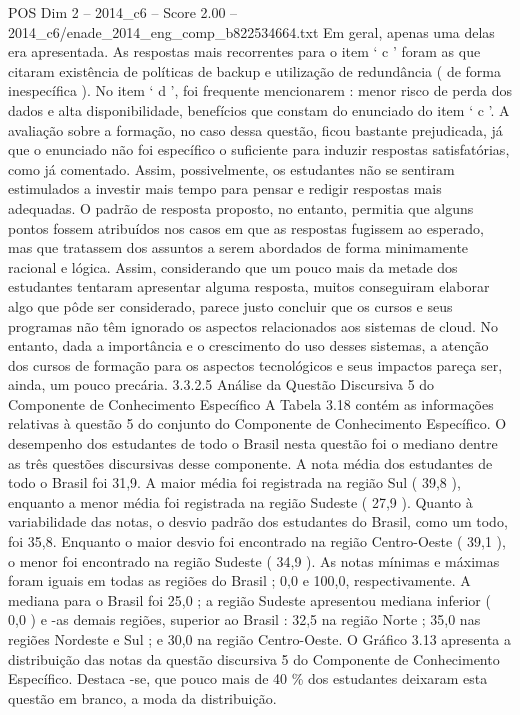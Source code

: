 \begin{textsample}{POS Dim 2 – 2014\_c6 – Score 2.00 – 2014\_c6/enade\_2014\_eng\_comp\_b822534664.txt}
Em geral, apenas uma delas era apresentada.
As respostas mais recorrentes para o item ‘ c ’ foram as que citaram existência de políticas de backup e utilização de redundância ( de forma inespecífica ).
No item ‘ d ’, foi frequente mencionarem : menor risco de perda dos dados e alta disponibilidade, benefícios que constam do enunciado do item ‘ c ’.
A avaliação sobre a formação, no caso dessa questão, ficou bastante prejudicada, já que o enunciado não foi específico o suficiente para induzir respostas satisfatórias, como já comentado.
Assim, possivelmente, os estudantes não se sentiram estimulados a investir mais tempo para pensar e redigir respostas mais adequadas.
O padrão de resposta proposto, no entanto, permitia que alguns pontos fossem atribuídos nos casos em que as respostas fugissem ao esperado, mas que tratassem dos assuntos a serem abordados de forma minimamente racional e lógica.
Assim, considerando que um pouco mais da metade dos estudantes tentaram apresentar alguma resposta, muitos conseguiram elaborar algo que pôde ser considerado, parece justo concluir que os cursos e seus programas não têm ignorado os aspectos relacionados aos sistemas de cloud.
No entanto, dada a importância e o crescimento do uso desses sistemas, a atenção dos cursos de formação para os aspectos tecnológicos e seus impactos pareça ser, ainda, um pouco precária. 3.3.2.5 Análise da Questão Discursiva 5 do Componente de Conhecimento Específico A Tabela 3.18 contém as informações relativas à questão 5 do conjunto do Componente de Conhecimento Específico.
O desempenho dos estudantes de todo o Brasil nesta questão foi o mediano dentre as três questões discursivas desse componente.
A nota média dos estudantes de todo o Brasil foi 31,9.
A maior média foi registrada na região Sul ( 39,8 ), enquanto a menor média foi registrada na região Sudeste ( 27,9 ).
Quanto à variabilidade das notas, o desvio padrão dos estudantes do Brasil, como um todo, foi 35,8.
Enquanto o maior desvio foi encontrado na região Centro-Oeste ( 39,1 ), o menor foi encontrado na região Sudeste ( 34,9 ).
As notas mínimas e máximas foram iguais em todas as regiões do Brasil ; 0,0 e 100,0, respectivamente.
A mediana para o Brasil foi 25,0 ; a região Sudeste apresentou mediana inferior ( 0,0 ) e -as demais regiões, superior ao Brasil : 32,5 na região Norte ; 35,0 nas regiões Nordeste e Sul ; e 30,0 na região Centro-Oeste.
O Gráfico 3.13 apresenta a distribuição das notas da questão discursiva 5 do Componente de Conhecimento Específico.
Destaca -se, que pouco mais de 40 \% dos estudantes deixaram esta questão em branco, a moda da distribuição.

\end{textsample}
